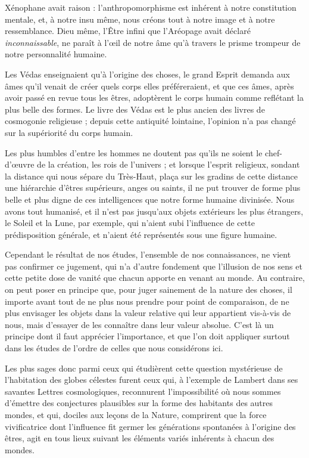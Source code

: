 \documentclass[a4paper, 11pt, oneside]{article}
\begin{document}
Xénophane avait raison : l'anthropomorphisme est inhérent à notre constitution mentale, et, à notre insu même, nous créons tout à notre image et à notre ressemblance. Dieu même, l'Être infini que l'Aréopage avait déclaré \emph{inconnaissable}, ne paraît à l'œil de notre âme qu'à travers le prisme trompeur de notre personnalité humaine.

Les Védas enseignaient qu'à l'origine des choses, le grand Esprit demanda aux âmes qu'il venait de créer quels corps elles préféreraient, et que ces âmes, après avoir passé en revue tous les êtres, adoptèrent le corps humain comme reflétant la plus belle des formes. Le livre des Védas est le plus ancien des livres de cosmogonie religieuse ; depuis cette antiquité lointaine, l'opinion n'a pas changé sur la supériorité du corps humain.

Les plus humbles d'entre les hommes ne doutent pas qu'ils ne soient le chef-d'œuvre de la création, les rois de l'univers ; et lorsque l'esprit religieux, sondant la distance qui nous sépare du Très-Haut, plaça sur les gradins de cette distance une hiérarchie d'êtres supérieurs, anges ou saints, il ne put trouver de forme plus belle et plus digne de ces intelligences que notre forme humaine divinisée. Nous avons tout humanisé, et il n'est pas jusqu'aux objets extérieurs les plus étrangers, le Soleil et la Lune, par exemple, qui n'aient subi l'influence de cette prédisposition générale, et n'aient été représentés sous une figure humaine.

Cependant le résultat de nos études, l'ensemble de nos connaissances, ne vient pas confirmer ce jugement, qui n'a d'autre fondement que l'illusion de nos sens et cette petite dose de vanité que chacun apporte en venant au monde. Au contraire, on peut poser en principe que, pour juger sainement de la nature des choses, il importe avant tout de ne plus nous prendre pour point de comparaison, de ne plus envisager les objets dans la valeur relative qui leur appartient vis-à-vis de nous, mais d'essayer de les connaître dans leur valeur absolue. C'est là un principe dont il faut apprécier l'importance, et que l'on doit appliquer surtout dans les études de l'ordre de celles que nous considérons ici.

Les plus sages donc parmi ceux qui étudièrent cette question mystérieuse de l'habitation des globes célestes furent ceux qui, à l'exemple de Lambert dans ses savantes Lettres cosmologiques, reconnurent l'impossibilité où nous sommes d'émettre des conjectures plausibles sur la forme des habitants des autres mondes, et qui, dociles aux leçons de la Nature, comprirent que la force vivificatrice dont l'influence fit germer les générations spontanées à l'origine des êtres, agit en tous lieux suivant les éléments variés inhérents à chacun des mondes.
\end{document}
